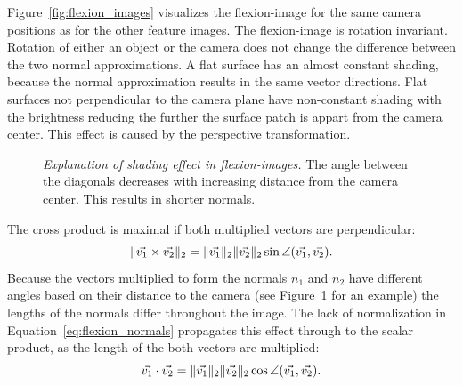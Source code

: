 Figure~\ref{fig:flexion_images} visualizes the \Gls{flexion-image} for the same camera positions as for the other feature images.
The \gls{flexion-image} is rotation invariant.
Rotation of either an object or the camera does not change the difference between the two normal approximations.
A flat surface has an almost constant shading, because the normal approximation results in the same vector directions.
Flat surfaces not perpendicular to the camera plane have non-constant shading with the brightness reducing the further the surface patch is appart from the camera center.
This effect is caused by the perspective transformation.
\begin{figure}[H]
    
    \caption[Explanation of shading effect in \glspl{flexion-image}]{\emph{Explanation of shading effect in \glspl{flexion-image}.} The angle between the diagonals decreases with increasing distance from the camera center. This results in shorter normals.}\label{fig:flexion_angle_decrease}
\end{figure}
The cross product is maximal if both multiplied vectors are perpendicular:
\begin{equation*}
    \lVert\vec{v_1} \times \vec{v_2}\rVert_{2} = \lVert\vec{v_1}\rVert_{2} \lVert\vec{v_2}\rVert_{2} \sin \angle(\vec{v_1}, \vec{v_2})\text{.}
\end{equation*}
\pagebreak[4]
Because the vectors multiplied to form the normals $n_1$ and $n_2$ have different angles based on their distance to the camera (see Figure~\ref{fig:flexion_angle_decrease} for an example) the lengths of the normals differ throughout the image.
The lack of normalization in Equation~\ref{eq:flexion_normals} propagates this effect through to the scalar product, as the length of the both vectors are multiplied:
\begin{equation*}
    \vec{v_1} \cdot \vec{v_2} = \lVert\vec{v_1}\rVert_{2} \lVert\vec{v_2}\rVert_{2} \cos \angle(\vec{v_1}, \vec{v_2})\text{.}
\end{equation*}
